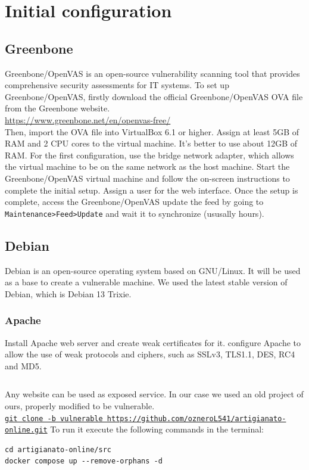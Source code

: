 \chapter{Initial configuration}
\label{chap:initial_configuration}

\section{Greenbone}
\label{sec:greenbone}
Greenbone/OpenVAS is an open-source vulnerability 
scanning tool that provides comprehensive security 
assessments for IT systems.
To set up Greenbone/OpenVAS, firstly download the official 
Greenbone/OpenVAS OVA file from the Greenbone website.\\
\href{https://www.greenbone.net/en/openvas-free/}{https://www.greenbone.net/en/openvas-free/} \\
Then, import the OVA file into
VirtualBox 6.1 or higher.
Assign at least 5GB of RAM and 2 CPU cores to the virtual machine. 
It's better to use about 12GB of RAM.
For the first configuration, use the bridge network adapter, which allows the virtual machine to be on the same network as the host machine.
Start the Greenbone/OpenVAS virtual machine and follow the on-screen instructions to complete the initial setup.
Assign a user for the web interface.
Once the setup is complete, access the Greenbone/OpenVAS update the feed 
by going to \texttt{Maintenance>Feed>Update} and wait it to synchronize
(ususally hours).

\section{Debian}
\label{sec:debian}
Debian is an open-source operating system based on GNU/Linux.
It will be used as a base to create a vulnerable machine.
We used the latest stable version of Debian, which is Debian 13 Trixie.
\subsection{Apache}
\label{sec:apache}
Install Apache web server and create weak certificates for it.
configure Apache to allow the use of weak protocols 
and ciphers, such as SSLv3, TLS1.1, DES, RC4 and MD5.
\inputminted{bash}{../project/apache/setup.sh}
Any website can be used as exposed service. 
In our case we used an old project of ours,
properly modified to be vulnerable.\\
\texttt{\href{https://github.com/ozneroL541/artigianato-online.git}
{git clone -b vulnerable https://github.com/ozneroL541/artigianato-online.git}}
To run it execute the following commands in the terminal:
\begin{verbatim}
cd artigianato-online/src
docker compose up --remove-orphans -d
\end{verbatim}

